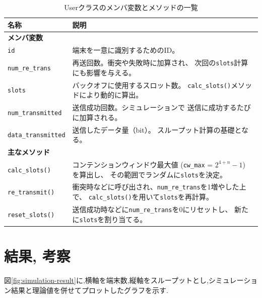 \documentclass[a4paper, 10pt]{ltjsarticle}
\begin{document}
\begin{table}[H]
  \centering
  \caption{Userクラスのメンバ変数とメソッドの一覧}
  \label{tab:user-class}
  \begin{tabularx}{\columnwidth}{lX}
    \hline
    \textbf{名称} & \textbf{説明} \\
    \hline
    \multicolumn{2}{l}{\textbf{メンバ変数}} \\[2pt]
    \hline
    \texttt{id} & 端末を一意に識別するためのID。 \\
    \texttt{num\_re\_trans} & 再送回数。衝突や失敗時に加算され、\newline
                             次回の\texttt{slots}計算にも影響を与える。 \\
    \texttt{slots} & バックオフに使用するスロット数。 \newline
                    \texttt{calc\_slots()}メソッドにより動的に算出。 \\
    \texttt{num\_transmitted} & 送信成功回数。シミュレーションで\newline
                               送信に成功するたびに加算される。 \\
    \texttt{data\_transmitted} & 送信したデータ量（bit）。\newline
                                スループット計算の基礎となる。 \\
    \hline
    \multicolumn{2}{l}{\textbf{主なメソッド}} \\[2pt]
    \hline
    \texttt{calc\_slots()} & コンテンションウィンドウ最大値 \newline
                            (\texttt{cw\_max} = $2^{4+n} - 1$) を算出し、\newline
                            その範囲でランダムに\texttt{slots}を決定。 \\
    \texttt{re\_transmit()} & 衝突時などに呼び出され、\texttt{num\_re\_trans}を1増やした上で、\newline
                             \texttt{calc\_slots()}を用いて\texttt{slots}を再計算。 \\
    \texttt{reset\_slots()} & 送信成功時などに\texttt{num\_re\_trans}を0にリセットし、\newline
                             新たに\texttt{slots}を割り当てる。 \\
    \hline
  \end{tabularx}
\end{table}



\section{結果, 考察}
図\ref{fig:simulation-result}に,横軸を端末数,縦軸をスループットとし,シミュレーション結果と理論値を併せてプロットしたグラフを示す.
\end{document}
